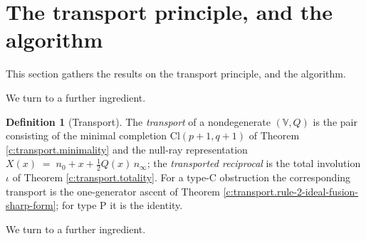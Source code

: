 \documentclass[11pt]{article}
\theoremstyle{definition}
\newtheorem{definition}[theorem]{Definition}
\theoremstyle{plain}
\providecommand{\Cl}{}\renewcommand{\Cl}{\mathrm{Cl}}
\providecommand{\nInf}{}\renewcommand{\nInf}{n_\infty}
\providecommand{\nO}{}\renewcommand{\nO}{n_0}
\begin{document}
\section{The transport principle, and the algorithm}

This section gathers the results on the transport principle, and the algorithm.

We turn to a further ingredient.

\begin{definition}[Transport]\label{c:obj.transport.transport}
The \emph{transport} of a nondegenerate $(\mathbb{V}, Q)$ is the pair consisting of the minimal completion $\Cl(p{+}1,q{+}1)$ of Theorem \ref{c:transport.minimality} and the null-ray representation $X(x) \;=\; \nO + x + \tfrac12 Q(x)\, \nInf$; the \emph{transported reciprocal} is the total involution $\iota$ of Theorem \ref{c:transport.totality}. For a type-C obstruction the corresponding transport is the one-generator ascent of Theorem \ref{c:transport.rule-2-ideal-fusion-sharp-form}; for type P it is the identity.
\end{definition}

We turn to a further ingredient.
\end{document}

